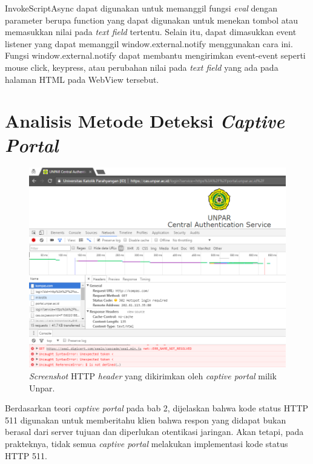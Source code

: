 InvokeScriptAsync dapat digunakan untuk memanggil fungsi \textit{eval} dengan parameter berupa function yang dapat digunakan untuk menekan tombol atau memasukkan nilai pada \textit{text field} tertentu. Selain itu, dapat dimasukkan event listener yang dapat memanggil window.external.notify menggunakan cara ini. Fungsi window.external.notify dapat membantu mengirimkan event-event seperti mouse click, keypress, atau perubahan nilai pada \textit{text field} yang ada pada halaman HTML pada WebView tersebut.



\section{Analisis Metode Deteksi \textit{Captive Portal}}
\label{sec:deteksi_captive_portal}

\begin{figure}[h]
    \centering
    \includegraphics[scale=0.45]{Gambar/Inspect.png}
    \caption[\textit{Screenshot} HTTP \textit{header} yang dikirimkan oleh \textit{captive portal} milik Unpar.]{\textit{Screenshot} HTTP \textit{header} yang dikirimkan oleh \textit{captive portal} milik Unpar.} 
    \label{fig:inspect}
\end{figure}

Berdasarkan teori \textit{captive portal} pada bab 2, dijelaskan bahwa kode status HTTP 511 digunakan untuk memberitahu klien bahwa respon yang didapat bukan berasal dari server tujuan dan diperlukan otentikasi jaringan. Akan tetapi, pada prakteknya, tidak semua \textit{captive portal} melakukan implementasi kode status HTTP 511.


